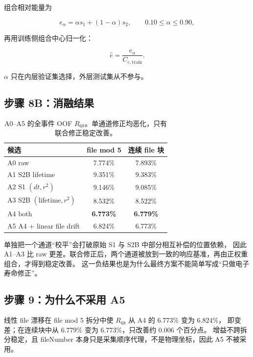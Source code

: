 \documentclass[UTF8,12pt,a4paper,oneside,fontset=none]{ctexart}
\numberwithin{equation}{section}
\newcommand{\Rsixtyeight}{R_{68}}
\newcommand{\Erel}{\hat e}
\begin{document}
组合相对能量为

\begin{equation}
e_{\alpha}
=
\alpha s_1+(1-\alpha)s_2,
\qquad 0.10\le\alpha\le0.90,
\label{eq:a4-energy}
\end{equation}

再用训练侧组合中心归一化：

\begin{equation}
\Erel
=
\frac{e_{\alpha}}{C_{e,\mathrm{train}}}.
\label{eq:relative-energy}
\end{equation}

\(\alpha\) 只在内层验证集选择，外层测试集从不参与。

\subsection{步骤 8B：消融结果}

\begin{table}[H]
\centering
\caption{A0--A5 的全事件 OOF \(\Rsixtyeight\)。单通道修正均恶化，只有联合修正稳定改善。}
\label{tab:a4-ablation}
\begin{tabular}{lcc}
\toprule
候选 & file mod 5 & 连续 file 块 \\
\midrule
A0 raw & 7.774\% & 7.893\% \\
A1 S2B lifetime & 9.351\% & 9.383\% \\
A2 S1 \((dt,r^2)\) & 9.146\% & 9.085\% \\
A3 S2B \((\text{lifetime},r^2)\) & 8.532\% & 8.522\% \\
\rowcolor{SoftTeal}
A4 both & \textbf{6.773\%} & \textbf{6.779\%} \\
A5 A4 + linear file drift & 6.824\% & 6.773\% \\
\bottomrule
\end{tabular}
\end{table}

单独把一个通道“校平”会打破原始 S1 与 S2B 中部分相互补偿的位置依赖，
因此 A1--A3 比 raw 更差。联合修正后，两个通道被放到一致的响应基准，再由正权重组合，才得到稳定改善。
这一负结果也是为什么最终方案不能简单写成“只做电子寿命修正”。

\subsection{步骤 9：为什么不采用 A5}

线性 file 漂移在 file mod 5 拆分中使 \(\Rsixtyeight\) 从 A4 的 \(6.773\%\) 变为 \(6.824\%\)，
即变差；在连续块中从 \(6.779\%\) 变为 \(6.773\%\)，只改善约 \(0.006\) 个百分点。
增益不跨拆分稳定，且 fileNumber 本身只是采集顺序代理，不是物理坐标，因此 A5 不被采用。
\end{document}
